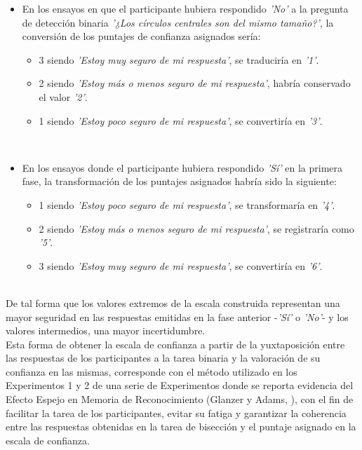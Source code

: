 \begin{itemize}
\begin{itemize}
\begin{itemize}
\item En los ensayos en que el participante hubiera respondido \textit{'No'} a la pregunta de detección binaria \textit{'¿Los círculos centrales son del mismo tamaño?'}, la conversión de los puntajes de confianza asignados sería:\\
	\begin{itemize}
	\item 3 siendo \textit{'Estoy muy seguro de mi respuesta'}, se traduciría en \textit{'1'}.\\
	\item 2 siendo \textit{'Estoy más o menos seguro de mi respuesta'}, habría conservado el valor \textit{'2'}.\\
	\item 1 siendo \textit{'Estoy poco seguro de mi respuesta'}, se convertiría en \textit{'3'}.\\
	\end{itemize}
\\
\item En los ensayos donde el participante hubiera respondido \textit{'Sí'} en la primera fase, la transformación de los puntajes asignados habría sido la siguiente:\\
	\begin{itemize}
	\item 1 siendo \textit{'Estoy poco seguro de mi respuesta'}, se transformaría en \textit{'4'}.\\
	\item 2 siendo \textit{'Estoy más o menos seguro de mi respuesta'}, se registraría como \textit{'5'}.\\
	\item 3 siendo \textit{'Estoy muy seguro de mi respuesta'}, se convertiría en \textit{'6'}.\\
	\end{itemize}
\end{itemize}\\

De tal forma que los valores extremos de la escala construida representan una mayor seguridad en las respuestas emitidas en la fase anterior -\textit{'Sí'} o \textit{'No'}- y los valores intermedios, una mayor incertidumbre.\\

Esta forma de obtener la escala de confianza a partir de la yuxtaposición entre las respuestas de los participantes a la tarea binaria y la valoración de su confianza en las mismas, corresponde con el método utilizado en los Experimentos 1 y 2 de una serie de Experimentos donde se reporta evidencia del Efecto Espejo  en Memoria de Reconocimiento (Glanzer y Adams, \citeyear{Glanzer1990}), con el fin de facilitar la tarea de los participantes, evitar su fatiga y garantizar la coherencia entre las respuestas obtenidas en la tarea de bisección y el puntaje asignado en la escala de confianza.\\


\end{itemize}
\end{itemize}
